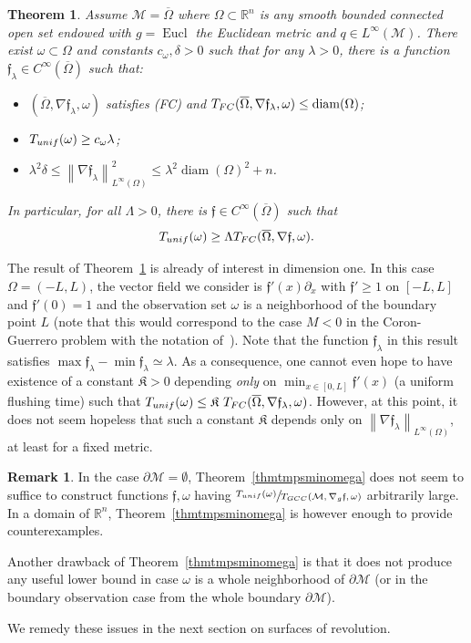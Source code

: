 \documentclass[11pt]{article}
\numberwithin{equation}{section}
\newcommand{\FC}{\textup{FC}}
\newcommand{\pFC}{\textup{(FC)}\xspace}
\newcommand{\GCC}{\textup{GCC}}
\newcommand{\unif}{\textup{unif}}
\newtheorem{theorem}[lemma]{Theorem}
\theoremstyle{definition}
\newtheorem{remark}[lemma]{Remark}
\newcommand{\M}{\ensuremath{\mathcal M}}
\newcommand{\mb}[1]{\ensuremath{\mathbb{#1}}}
\newcommand{\R}{{\mb{R}}}
\newcommand{\f}{\ensuremath{\mathfrak{f}}}
\DeclareMathOperator{\Eucl}{Eucl}
\DeclareMathOperator{\diam}{diam}
\newcommand\nablag{\nabla_{g}}
\newcommand\nor[2]{\left\|#1\right\|_{#2}}
\let\d\partial
\let\ovl\overline
\begin{document}
\begin{theorem}
\label{thm:counterexamplesomega}
Assume $\M = \ovl{\Omega}$ where $\Omega \subset \R^n$ is any smooth bounded connected open set endowed with $g=\Eucl$ the Euclidean metric and $q \in L^\infty(\M)$. There exist $\omega\subset \Omega$ and constants $c_\omega,\delta>0$ such that for any $\lambda>0$, there is a function $\f_\lambda \in C^\infty(\ovl{\Omega})$ such that:
\begin{itemize}
\item $(\ovl{\Omega},\nabla \f_\lambda,\omega)$ satisfies \pFC and $T_{\FC}(\ovl{\Omega},\nabla \f_\lambda,\omega) \leq \diam(\Omega)$;
\item $T_{\unif}(\omega)\geq c_\omega \lambda$;
\item $ \lambda^2\delta\leq \nor{\nabla \f_\lambda}{L^\infty(\Omega)}^2 \leq \lambda^2 \diam(\Omega)^{2}+n$.
\end{itemize}
In particular, for all $\Lambda >0$, there is $\f \in C^\infty(\ovl{\Omega})$ such that
\[
T_{\unif}(\omega) \geq \Lambda T_{\FC}(\ovl{\Omega},\nabla \f,\omega).
\]
\end{theorem}
The result of Theorem~\ref{thm:counterexamplesomega} is already of interest in dimension one. In this case $\Omega = (-L,L)$, the vector field we consider is $\f'(x)\d_x$ with $\f'\geq 1$ on $[-L,L]$ and $\f'(0)=1$ and the observation set $\omega$ is a neighborhood of the boundary point $L$ (note that this would correspond to the case $M<0$ in the Coron-Guerrero problem with the notation of~\cite{CG:05}).
Note that the function $\f_\lambda$ in this result satisfies $\max \f_\lambda - \min \f_\lambda \simeq \lambda$.
As a consequence, one cannot even hope to have existence of a constant $\mathfrak{K}>0$ depending {\em only} on $\min_{x\in [0,L]}\f'(x)$ (a uniform flushing time) such that $T_{\unif}(\omega) \leq \mathfrak{K} \ T_{\FC}(\ovl{\Omega},\nabla \f_\lambda,\omega)$.
However, at this point, it does not seem hopeless that such a constant $\mathfrak{K}$ depends only on $\nor{\nabla \f_\lambda}{L^\infty(\Omega)}$, at least for a fixed metric.

\begin{remark}
In the case $\d\M = \emptyset$, Theorem~\ref{thmtmpsminomega} does not seem to suffice to construct functions $\f, \omega$ having $\sfrac{T_{\unif}(\omega)}{T_{\GCC}(\M,\nablag\f,\omega)}$ arbitrarily large. In a domain of $\R^n$, Theorem~\ref{thmtmpsminomega} is however enough to provide counterexamples.

Another drawback of Theorem~\ref{thmtmpsminomega} is that it does not produce any useful lower bound in case $\omega$ is a whole neighborhood of $\d\M$ (or in the boundary observation case from the whole boundary $\d\M$).

We remedy these issues in the next section on surfaces of revolution.
\end{remark}
\end{document}

